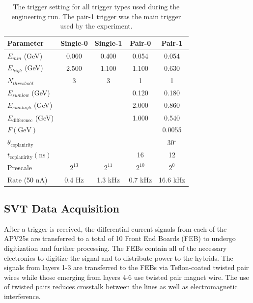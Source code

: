 \begin{table}
    \centering
    \begin{tabular}{lcccc}
        \toprule
        \textbf{Parameter} & \textbf{Single-0} & \textbf{Single-1} & \textbf{Pair-0} & \textbf{Pair-1} \\
        \midrule
        \midrule
        $E_{min}$ (GeV)      & 0.060 & 0.400 & 0.054 & 0.054 \\
        $E_{high}$ (GeV)     & 2.500 & 1.100 & 1.100 & 0.630 \\
        $N_{threshold}$      & 3     & 3     & 1     & 1     \\
        $E_{sum low}$ (GeV)  &       &       & 0.120 & 0.180 \\
        $E_{sum high}$ (GeV) &       &       & 2.000 & 0.860 \\
        $E_{\text{differenec}}$ (GeV) &       &       & 1.000 & 0.540 \\
        $F (\text{GeV})$ & & & & 0.0055 \\
        $\theta_{\text{coplanirity}}$ & & & & 30$^\circ$ \\
        $t_{\text{coplanirity}} (\text{ns})$ & & & 16 & 12 \\
        Prescale & $2^{13}$ & $2^{11}$ & $2^{10}$ & $2^{0}$ \\
        Rate (50 nA) & 0.4 Hz & 1.3 kHz & 0.7 kHz & 16.6 kHz \\
        \bottomrule
    \end{tabular}
    \caption{The trigger setting for all trigger types used during the 
             engineering run. The pair-1 trigger was the main trigger used 
             by the experiment.}
    \label{tab:triggers}
\end{table}

\subsection{SVT Data Acquisition}

After a trigger is received, the differential current signals 
from each of the APV25s are transferred to a total of 10 Front End Boards (FEB)
to undergo digitization and further processing.  The FEBs contain all of the
necessary electronics to digitize the signal and to distribute power to
the hybrids.
The signals from layers 1-3 are transferred to the FEBs via 
Teflon-coated twisted pair wires while those emerging from
layers 4-6 use twisted pair magnet wire.  The use of twisted pairs reduces
crosstalk between the lines as well as electromagnetic interference.

